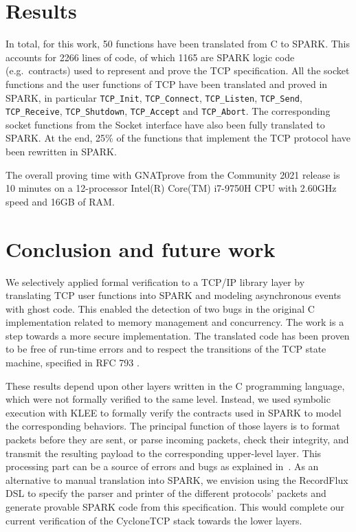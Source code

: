 \documentclass[conference]{IEEEtran}
\def\spark#1{\lstinline[language=Ada]{#1}}
\begin{document}
\section{Results}

In total, for this work, 50 functions have been translated from C to SPARK. This accounts for 2266 lines of code, of which 1165 are SPARK logic code (e.g.\ contracts) used to represent and prove the TCP specification. All the socket functions and the user functions of TCP have been translated and proved in SPARK, in particular \spark{TCP_Init}, \spark{TCP_Connect}, \spark{TCP_Listen}, \spark{TCP_Send}, \spark{TCP_Receive}, \spark{TCP_Shutdown}, \spark{TCP_Accept} and \spark{TCP_Abort}. The corresponding socket functions from the Socket interface have also been fully translated to SPARK.
At the end, 25\% of the functions that implement the TCP protocol have been rewritten in SPARK.

The overall proving time with GNATprove from the Community 2021 release is 10 minutes on a 12-processor Intel(R) Core(TM) i7-9750H CPU with 2.60GHz speed and 16GB of RAM.


\section{Conclusion and future work}

We selectively applied formal verification to a TCP/IP library layer by translating TCP user functions into SPARK and modeling asynchronous events with ghost code. This enabled the detection of two bugs in the original C implementation related to memory management and concurrency. The work is a step towards a more secure implementation. The translated code has been proven to be free of run-time errors and to respect the transitions of the TCP state machine, specified in RFC 793 \cite{rfc793}.

These results depend upon other layers written in the C programming language, which were not formally verified to the same level. Instead, we used symbolic execution with KLEE to formally verify the contracts used in SPARK to model the corresponding behaviors. The principal function of those layers is to format packets before they are sent, or parse incoming packets, check their integrity, and transmit the resulting payload to the corresponding upper-level layer. This processing part can be a source of errors and bugs as explained in~\cite{Reiher2019RecordFluxFM}. As an alternative to manual translation into SPARK, we envision using the RecordFlux DSL \cite{Reiher2019RecordFluxFM} to specify the parser and printer of the different protocols' packets and generate provable SPARK code from this specification. This would complete our current verification of the CycloneTCP stack towards the lower layers.
\end{document}

